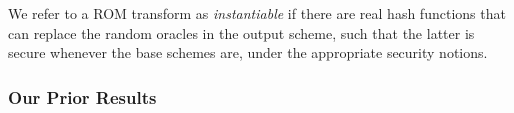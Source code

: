 We refer to a ROM transform as  \emph{instantiable} if there are real hash functions that can  replace the random oracles in the output scheme, such that the latter is secure whenever the base schemes are, under the appropriate security  notions. %






\subsubsection{Our Prior Results}

